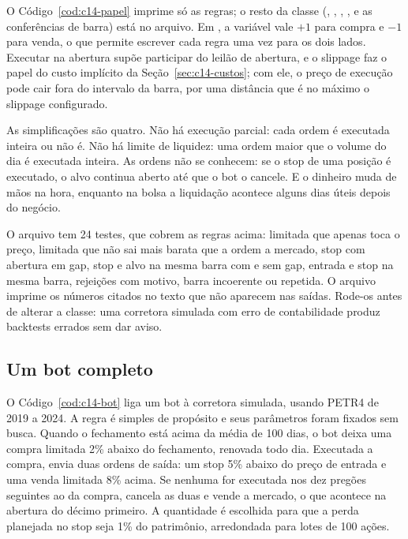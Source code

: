 O Código~\ref{cod:c14-papel} imprime só as regras; o resto da classe (, , , ,  e as conferências de barra) está no arquivo. Em , a variável  vale $+1$ para compra e $-1$ para venda, o que permite escrever cada regra uma vez para os dois lados. Executar na abertura supõe participar do leilão de abertura, e o slippage faz o papel do custo implícito da Seção~\ref{sec:c14-custos}; com ele, o preço de execução pode cair fora do intervalo da barra, por uma distância que é no máximo o slippage configurado.

As simplificações são quatro. Não há execução parcial: cada ordem é executada inteira ou não é. Não há limite de liquidez: uma ordem maior que o volume do dia é executada inteira. As ordens não se conhecem: se o stop de uma posição é executado, o alvo continua aberto até que o bot o cancele. E o dinheiro muda de mãos na hora, enquanto na bolsa a liquidação acontece alguns dias úteis depois do negócio.

\begin{repositorio}
O arquivo  tem 24 testes, que cobrem as regras acima: limitada que apenas toca o preço, limitada que não sai mais barata que a ordem a mercado, stop com abertura em gap, stop e alvo na mesma barra com e sem gap, entrada e stop na mesma barra, rejeições com motivo, barra incoerente ou repetida. O arquivo  imprime os números citados no texto que não aparecem nas saídas. Rode-os antes de alterar a classe: uma corretora simulada com erro de contabilidade produz backtests errados sem dar aviso.
\end{repositorio}

\subsection{Um bot completo}

O Código~\ref{cod:c14-bot} liga um bot à corretora simulada, usando PETR4 de 2019 a 2024. A regra é simples de propósito e seus parâmetros foram fixados sem busca. Quando o fechamento está acima da média de 100 dias, o bot deixa uma compra limitada 2\% abaixo do fechamento, renovada todo dia. Executada a compra, envia duas ordens de saída: um stop 5\% abaixo do preço de entrada e uma venda limitada 8\% acima. Se nenhuma for executada nos dez pregões seguintes ao da compra, cancela as duas e vende a mercado, o que acontece na abertura do décimo primeiro. A quantidade é escolhida para que a perda planejada no stop seja 1\% do patrimônio, arredondada para lotes de 100 ações.


